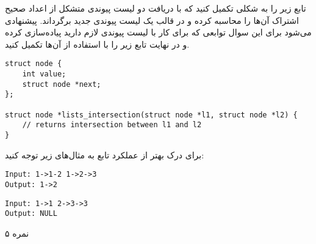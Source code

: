\documentclass[../main.tex]{subfiles}
\begin{document}
تابع زیر را به شکلی تکمیل کنید که با دریافت دو لیست پیوندی متشکل از اعداد صحیح اشتراک آن‌ها را محاسبه کرده و در قالب یک لیست پیوندی جدید برگرداند. پیشنهادی می‌شود برای این سوال توابعی که برای کار با لیست پیوندی لازم دارید پیاده‌سازی کرده و در نهایت تابع زیر را با استفاده از آن‌ها تکمیل کنید.

\begin{latin}
\begin{verbatim}
struct node {
    int value;
    struct node *next;
};

struct node *lists_intersection(struct node *l1, struct node *l2) {
    // returns intersection between l1 and l2
}
\end{verbatim}
\end{latin}

برای درک بهتر از عملکرد تابع به مثال‌های زیر توجه کنید:

\begin{latin}
\begin{verbatim}
Input: 1->1-2 1->2->3
Output: 1->2
\end{verbatim}

\begin{verbatim}
Input: 1->1 2->3->3
Output: NULL
\end{verbatim}
\end{latin}

۵ نمره
\end{document}
